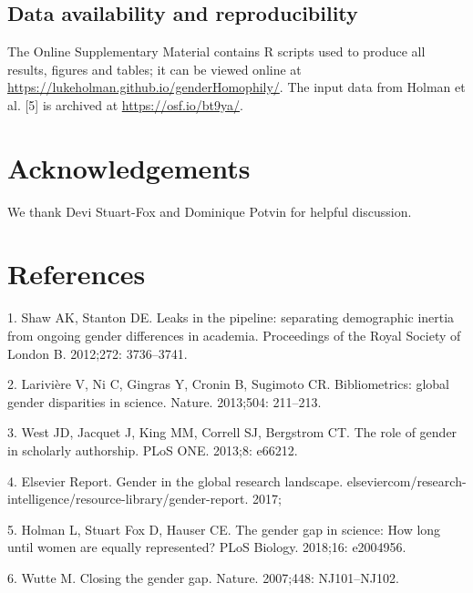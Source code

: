 \documentclass[12pt,]{article}
\begin{document}
\hypertarget{data-availability-and-reproducibility}{%
\subsection{Data availability and
reproducibility}\label{data-availability-and-reproducibility}}

The Online Supplementary Material contains R scripts used to produce all
results, figures and tables; it can be viewed online at
\url{https://lukeholman.github.io/genderHomophily/}. The input data from
Holman et al. {[}5{]} is archived at \url{https://osf.io/bt9ya/}.

\hypertarget{acknowledgements}{%
\section{Acknowledgements}\label{acknowledgements}}

We thank Devi Stuart-Fox and Dominique Potvin for helpful discussion.

\hypertarget{references}{%
\section{References}\label{references}}

\hypertarget{refs}{}
\leavevmode\hypertarget{ref-Shaw_2012}{}%
1. Shaw AK, Stanton DE. Leaks in the pipeline: separating demographic
inertia from ongoing gender differences in academia. Proceedings of the
Royal Society of London B. 2012;272: 3736--3741.

\leavevmode\hypertarget{ref-Lariviere_2013}{}%
2. Larivière V, Ni C, Gingras Y, Cronin B, Sugimoto CR. Bibliometrics:
global gender disparities in science. Nature. 2013;504: 211--213.

\leavevmode\hypertarget{ref-West_2013}{}%
3. West JD, Jacquet J, King MM, Correll SJ, Bergstrom CT. The role of
gender in scholarly authorship. PLoS ONE. 2013;8: e66212.

\leavevmode\hypertarget{ref-Elsevier_report}{}%
4. Elsevier Report. Gender in the global research landscape.
elseviercom/research-intelligence/resource-library/gender-report. 2017;

\leavevmode\hypertarget{ref-Holman_2018}{}%
5. Holman L, Stuart Fox D, Hauser CE. The gender gap in science: How
long until women are equally represented? PLoS Biology. 2018;16:
e2004956.

\leavevmode\hypertarget{ref-Wutte_2007}{}%
6. Wutte M. Closing the gender gap. Nature. 2007;448: NJ101--NJ102.
\end{document}
